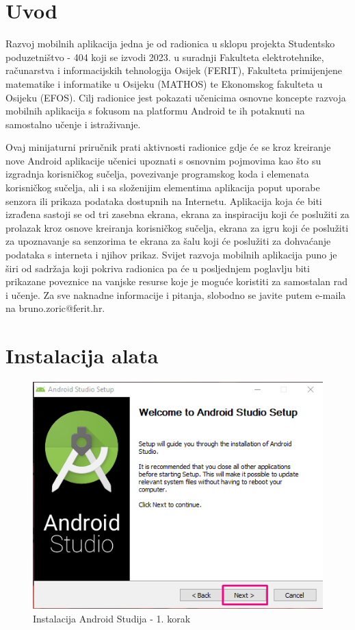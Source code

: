 \documentclass[11pt,a4paper,twoside]{article}
\begin{document}
	
\section{Uvod}

	Razvoj mobilnih aplikacija jedna je od radionica u sklopu projekta Studentsko poduzetništvo - 404 koji se izvodi 2023. u suradnji Fakulteta elektrotehnike, računarstva i informacijskih tehnologija Osijek (FERIT), Fakulteta primijenjene matematike i informatike u Osijeku (MATHOS) te Ekonomskog fakulteta u Osijeku (EFOS). Cilj radionice jest pokazati učenicima osnovne koncepte razvoja mobilnih aplikacija s fokusom na platformu Android te ih potaknuti na samostalno učenje i istraživanje.
	
	Ovaj minijaturni priručnik prati aktivnosti radionice gdje će se kroz kreiranje nove Android aplikacije učenici upoznati s osnovnim pojmovima kao što su izgradnja korisničkog sučelja, povezivanje programskog koda i elemenata korisničkog sučelja, ali i sa složenijim elementima aplikacija poput uporabe senzora ili prikaza podataka dostupnih na Internetu. Aplikacija koja će biti izrađena sastoji se od tri zasebna ekrana, ekrana za inspiraciju koji će poslužiti za prolazak kroz osnove kreiranja korisničkog sučelja, ekrana za igru koji će poslužiti za upoznavanje sa senzorima te ekrana za šalu koji će poslužiti za dohvaćanje podataka s interneta i njihov prikaz. Svijet razvoja mobilnih aplikacija puno je širi od sadržaja koji pokriva radionica pa će u posljednjem poglavlju biti prikazane poveznice na vanjske resurse koje je moguće koristiti za samostalan rad i učenje. Za sve naknadne informacije i pitanja, slobodno se javite putem e-maila na bruno.zoric@ferit.hr.
	
\section{Instalacija alata}

\begin{figure}[!h]
	\centering
	\includegraphics{install_01.png}
	\caption{Instalacija Android Studija - 1. korak}
	\label{fig:install_01}	
\end{figure}
\end{document}
